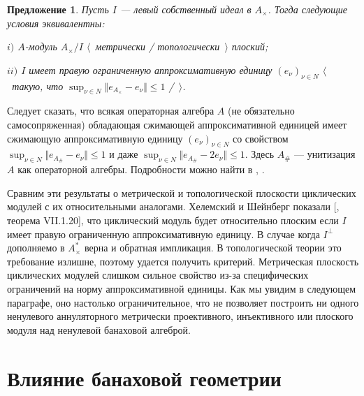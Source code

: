 \documentclass[12pt]{article}
\newtheorem{proposition}[theorem]{Предложение}
\begin{document}
\begin{proposition}\label{MetTopFlatCycModCharac} Пусть $I$ --- левый собственный идеал в $A_\times $. Тогда следующие условия эквивалентны:

$i)$ $A$-модуль $A_\times /I$ $\langle$~метрически / топологически~$\rangle$ плоский;

$ii)$ $I$ имеет правую ограниченную аппроксимативную единицу $(e_\nu)_{\nu\in N}$ $\langle$~такую, что $\sup_{\nu\in N}\Vert e_{A_\times }-e_\nu\Vert\leq 1$ /~$\rangle$.
\end{proposition}

Следует сказать, что всякая операторная алгебра $A$ (не обязательно самосопряженная) обладающая сжимающей аппроксимативной единицей имеет сжимающую аппроксимативную единицу $(e_\nu)_{\nu\in N}$ со свойством $\sup_{\nu\in N}\Vert e_{A_\#}-e_\nu\Vert\leq 1$ и даже $\sup_{\nu\in N}\Vert e_{A_\#}-2e_\nu\Vert\leq 1$. Здесь $A_\#$ --- унитизация $A$ как операторной алгебры. Подробности можно найти в \cite{PosAndApproxIdinBanAlg}, \cite{BleContrAppIdInOpAlg}.

Сравним эти результаты о метрической и топологической плоскости циклических модулей с их относительными аналогами. Хелемский и Шейнберг показали [\cite{HelHomolBanTopAlg}, теорема VII.1.20], что циклический модуль будет относительно плоским если $I$ имеет правую ограниченную аппроксимативную единицу. В случае когда $I^\perp$ дополняемо в $A_\times^*$ верна и обратная импликация. В топологической теории это требование излишне, поэтому удается получить критерий. Метрическая плоскость циклических модулей слишком сильное свойство из-за специфических ограничений на норму аппроксимативной единицы. Как мы увидим в следующем параграфе, оно настолько ограничительное, что не позволяет построить ни одного ненулевого аннуляторного метрически проективного, инъективного или плоского модуля над ненулевой банаховой алгеброй.


\section{Влияние банаховой геометрии}
\label{SectionTheImpactOfBanachGeometry}


\end{document}

